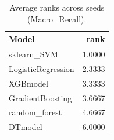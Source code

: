 \begin{table}[t]
\centering
\begin{tabular}{lr}
\toprule
Model & rank \\
\midrule
sklearn_SVM & 1.0000 \\
LogisticRegression & 2.3333 \\
XGBmodel & 3.3333 \\
GradientBoosting & 3.6667 \\
random_forest & 4.6667 \\
DTmodel & 6.0000 \\
\bottomrule
\end{tabular}
\caption{Average ranks across seeds (Macro_Recall).}
\label{tab:avg_rank_Macro_Recall}
\end{table}